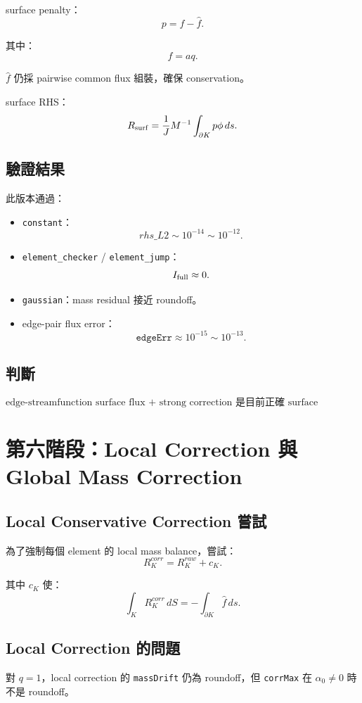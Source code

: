 \documentclass[UTF8,12pt,a4paper]{ctexart}
\begin{document}
surface penalty：
\[
p=f-\hat f.
\]

其中：
\[
f=aq.
\]

$\hat f$ 仍採 pairwise common flux 組裝，確保 conservation。

surface RHS：
\[
R_{\rm surf}
=
\frac{1}{J}
M^{-1}
\int_{\partial K}
p\phi\,ds.
\]

\subsection{驗證結果}

此版本通過：
\begin{itemize}
  \item \texttt{constant}：
  \[
  rhs\_L2\sim10^{-14}\sim10^{-12}.
  \]
  \item \texttt{element\_checker} / \texttt{element\_jump}：
  \[
  I_{\rm full}\approx0.
  \]
  \item \texttt{gaussian}：mass residual 接近 roundoff。
  \item edge-pair flux error：
  \[
  \texttt{edgeErr}\approx10^{-15}\sim10^{-13}.
  \]
\end{itemize}

\subsection{判斷}

\[
\boxed{
\text{edge-streamfunction surface flux + strong correction 是目前正確 surface formulation。}
}
\]

\section{第六階段：Local Correction 與 Global Mass Correction}

\subsection{Local Conservative Correction 嘗試}

為了強制每個 element 的 local mass balance，嘗試：
\[
R_K^{corr}
=
R_K^{raw}+c_K.
\]

其中 $c_K$ 使：
\[
\int_K R_K^{corr}\,dS
=
-\int_{\partial K}\hat f\,ds.
\]

\subsection{Local Correction 的問題}

對 $q=1$，local correction 的 \texttt{massDrift} 仍為 roundoff，但 \texttt{corrMax} 在 $\alpha_0\neq0$ 時不是 roundoff。
\end{document}
